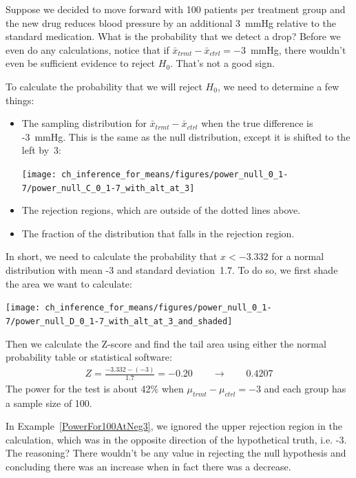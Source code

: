 \begin{examplewrap}
\begin{nexample}{Suppose we decided to move forward with 100 patients per treatment group and the new drug reduces blood pressure by an additional 3~mmHg relative to the standard medication. What is the probability that we detect a drop?}\label{PowerFor100AtNeg3}
Before we even do any calculations, notice that if $\bar{x}_{trmt} - \bar{x}_{ctrl} = -3$~mmHg, there wouldn't even be sufficient evidence to reject $H_0$. That's not a good sign.

To calculate the probability that we will reject $H_0$, we need to determine a few things:
\begin{itemize}
\setlength{\itemsep}{0mm}
\item The sampling distribution for $\bar{x}_{trmt} - \bar{x}_{ctrl}$ when the true difference is -3~mmHg. This is the same as the null distribution, except it is shifted to the left by~3:
\begin{center}
\texttt{[image: ch\_inference\_for\_means/figures/power\_null\_0\_1-7/power\_null\_C\_0\_1-7\_with\_alt\_at\_3]}
\end{center}
\item The rejection regions, which are outside of the dotted lines above.
\item The fraction of the distribution that falls in the rejection region.
\end{itemize}
In short, we need to calculate the probability that $x < -3.332$ for a normal distribution with mean -3 and standard deviation~1.7. To do so, we first shade the area we want to calculate:
\begin{center}
\texttt{[image: ch\_inference\_for\_means/figures/power\_null\_0\_1-7/power\_null\_D\_0\_1-7\_with\_alt\_at\_3\_and\_shaded]}
\end{center}
Then we calculate the Z-score and find the tail area using either the normal probability table or statistical software:
\begin{align*}
Z = \frac{-3.332 - (-3)}{1.7} = -0.20 \qquad \to \qquad 0.4207
\end{align*}
The power for the test is about 42\% when $\mu_{trmt} - \mu_{ctrl} = -3$ and each group has a sample size of 100.
\end{nexample}
\end{examplewrap}

In Example~\ref{PowerFor100AtNeg3}, we ignored the upper rejection region in the calculation, which was in the opposite direction of the hypothetical truth, i.e. -3. The reasoning? There wouldn't be any value in rejecting the null hypothesis and concluding there was an increase when in fact there was a decrease.



